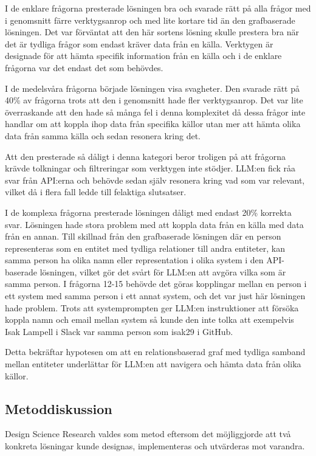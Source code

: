 I de enklare frågorna presterade lösningen bra och svarade rätt på alla frågor med i genomsnitt färre verktygsanrop och med lite kortare tid än den grafbaserade lösningen.
Det var förväntat att den här sortens lösning skulle prestera bra när det är tydliga frågor som endast kräver data från en källa.
 Verktygen är designade för att hämta specifik information från en källa och i de enklare frågorna var det endast det som behövdes.

I de medelsvåra frågorna började lösningen visa svagheter. Den svarade rätt på 40\% av frågorna trots att den i genomsnitt hade fler verktygsanrop.
Det var lite överraskande att den hade så många fel i denna komplexitet då dessa frågor inte handlar om att koppla ihop data från specifika källor utan mer att hämta olika data från samma källa och sedan resonera kring det.

Att den presterade så dåligt i denna kategori beror troligen på att frågorna krävde tolkningar och filtreringar som verktygen inte stödjer.
LLM:en fick råa svar från API:erna och behövde sedan själv resonera kring vad som var relevant, vilket då i flera fall ledde till felaktiga slutsatser.

I de komplexa frågorna presterade lösningen dåligt med endast 20\% korrekta svar.
Lösningen hade stora problem med att koppla data från en källa med data från en annan.
Till skillnad från den grafbaserade lösningen där en person representeras som en entitet med tydliga relationer till andra entiteter, kan samma person ha olika namn eller representation i olika system i den API-baserade lösningen, vilket gör det svårt för LLM:en att avgöra vilka som är samma person.
I frågorna 12-15 behövde det göras kopplingar mellan en person i ett system med samma person i ett annat system, och det var just här lösningen hade problem. 
Trots att systemprompten ger LLM:en instruktioner att försöka koppla namn och email mellan system så kunde den inte tolka att exempelvis Isak Lampell i Slack var samma person som isak29 i GitHub.

Detta bekräftar hypotesen om att en relationsbaserad graf med tydliga samband mellan entiteter underlättar för LLM:en att navigera och hämta data från olika källor.

\subsection{Metoddiskussion}\label{subsec:project_method_discussion}

Design Science Research valdes som metod eftersom det möjliggjorde att två konkreta lösningar kunde designas, implementeras och utvärderas mot varandra.

